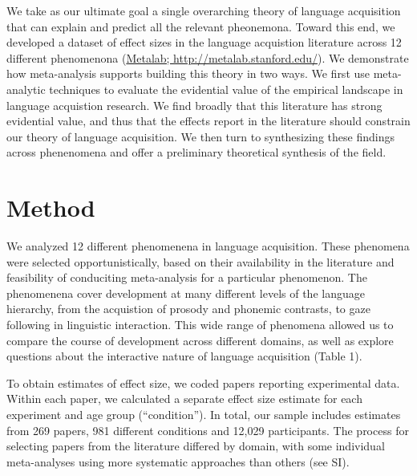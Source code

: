 \documentclass[english,floatsintext,man]{apa6}
\begin{document}
We take as our ultimate goal a single overarching theory of language
acquisition that can explain and predict all the relevant pheonemona.
Toward this end, we developed a dataset of effect sizes in the language
acquistion literature across 12 different phenomenona
(\href{http://metalab.stanford.edu}{Metalab;
http://metalab.stanford.edu/}). We demonstrate how meta-analysis
supports building this theory in two ways. We first use meta-analytic
techniques to evaluate the evidential value of the empirical landscape
in language acquistion research. We find broadly that this literature
has strong evidential value, and thus that the effects report in the
literature should constrain our theory of language acquisition. We then
turn to synthesizing these findings across phenenomena and offer a
preliminary theoretical synthesis of the field.

\section{Method}\label{method}

We analyzed 12 different phenomenena in language acquisition. These
phenomena were selected opportunistically, based on their availability
in the literature and feasibility of conduciting meta-analysis for a
particular phenomenon. The phenomenena cover development at many
different levels of the language hierarchy, from the acquistion of
prosody and phonemic contrasts, to gaze following in linguistic
interaction. This wide range of phenomena allowed us to compare the
course of development across different domains, as well as explore
questions about the interactive nature of language acquisition (Table
1).

To obtain estimates of effect size, we coded papers reporting
experimental data. Within each paper, we calculated a separate effect
size estimate for each experiment and age group (\enquote{condition}).
In total, our sample includes estimates from 269 papers, 981 different
conditions and 12,029 participants. The process for selecting papers
from the literature differed by domain, with some individual
meta-analyses using more systematic approaches than others (see SI).
\renewcommand{\arraystretch}{1.5}
\end{document}
